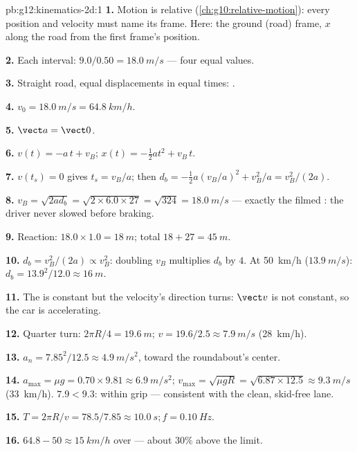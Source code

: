 \begin{solution}{pb:g12:kinematics-2d:1}
\textbf{1.} Motion is relative (\cref{ch:g10:relative-motion}): every
position and velocity must name its frame. Here: the ground (road)
frame, $x$ along the road from the first frame's position.

\textbf{2.} Each interval: $9.0/0.50 = \qty{18.0}{m/s}$ --- four
equal values.

\textbf{3.} Straight road, equal displacements in equal times:
.

\textbf{4.} $v_0 = \qty{18.0}{m/s} = \qty{64.8}{km/h}$.

\textbf{5.} $\vect a = \vect 0$.

\textbf{6.} $v(t) = -a\,t + v_B$; $x(t) = -\tfrac12 a t^2 + v_B\,t$.

\textbf{7.} $v(t_s) = 0$ gives $t_s = v_B/a$; then
$d_b = -\tfrac12 a (v_B/a)^2 + v_B^2/a = v_B^2/(2a)$.

\textbf{8.} $v_B = \sqrt{2 a d_b} = \sqrt{2 \times 6.0 \times 27} =
\sqrt{324} = \qty{18.0}{m/s}$ --- exactly the filmed : the
driver never slowed before braking.

\textbf{9.} Reaction: $18.0 \times 1.0 = \qty{18}{m}$; total
$18 + 27 = \qty{45}{m}$.

\textbf{10.} $d_b = v_B^2/(2a) \propto v_B^2$: doubling $v_B$
multiplies $d_b$ by $4$. At \qty{50}{km/h} ($\qty{13.9}{m/s}$):
$d_b = 13.9^2/12.0 \approx \qty{16}{m}$.

\textbf{11.} The  is constant but the velocity's direction turns:
$\vect v$ is not constant, so the car is accelerating.

\textbf{12.} Quarter turn: $2\pi R/4 = \qty{19.6}{m}$;
$v = 19.6/2.5 \approx \qty{7.9}{m/s}$ (\qty{28}{km/h}).

\textbf{13.} $a_n = 7.85^2/12.5 \approx \qty{4.9}{m/s^2}$, toward the
roundabout's center.

\textbf{14.} $a_{\max} = \mu g = 0.70 \times 9.81 \approx
\qty{6.9}{m/s^2}$; $v_{\max} = \sqrt{\mu g R} =
\sqrt{6.87 \times 12.5} \approx \qty{9.3}{m/s}$ (\qty{33}{km/h}).
$7.9 < 9.3$: within grip --- consistent with the clean, skid-free
lane.

\textbf{15.} $T = 2\pi R/v = 78.5/7.85 \approx \qty{10.0}{s};
f = \qty{0.10}{Hz}$.

\textbf{16.} $64.8 - 50 \approx \qty{15}{km/h}$ over --- about
$30\%$ above the limit.


\end{solution}
